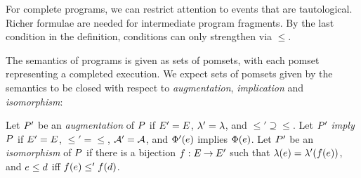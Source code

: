 For complete programs, we can restrict attention to events that are 
tautological.  Richer formulae are needed for
intermediate program fragments.
By the last condition in the definition,
conditions can only strengthen via $\le$.







The semantics of programs is given as sets of pomsets, with each pomset
representing a completed execution.
%
We expect sets of pomsets given by the semantics to be closed with
respect to \emph{augmentation}, \emph{implication} and \emph{isomorphism}:
\begin{definition}
  Let
  $P'$ be an \emph{augmentation} of $P$ if $E'=E$,
  ${\lambda'}={\lambda}$, and ${\le'}\supseteq{\le}$. %
  Let
  $P'$ \emph{imply} $P$ if $E'=E$, ${\le'}={\le}$,
  $\mathcal{A}'=\mathcal{A}$, and $\Phi'(e)$
  implies $\Phi(e)$. %
  Let
  $P'$ be an \emph{isomorphism} of $P$ if there is a bijection
  $f:E\mathbin\rightarrow E'$ such that $\lambda(e)=\lambda'(f(e))$, and
  $e\le d$ iff $f(e)\le'f(d)$. %
\end{definition}



